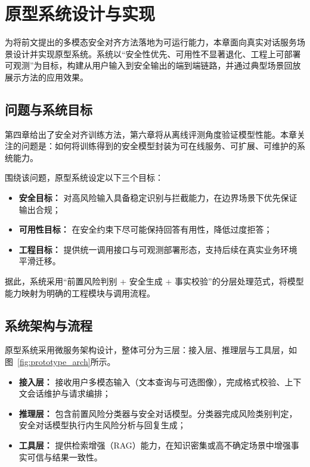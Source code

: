 \chapter{原型系统设计与实现}

为将前文提出的多模态安全对齐方法落地为可运行能力，本章面向真实对话服务场景设计并实现原型系统。系统以“安全性优先、可用性不显著退化、工程上可部署可观测”为目标，构建从用户输入到安全输出的端到端链路，并通过典型场景回放展示方法的应用效果。

\section{问题与系统目标}

第四章给出了安全对齐训练方法，第六章将从离线评测角度验证模型性能。本章关注的问题是：如何将训练得到的安全模型封装为可在线服务、可扩展、可维护的系统能力。

围绕该问题，原型系统设定以下三个目标：
\begin{itemize}
    \item \textbf{安全目标：} 对高风险输入具备稳定识别与拦截能力，在边界场景下优先保证输出合规；
    \item \textbf{可用性目标：} 在安全约束下尽可能保持回答有用性，降低过度拒答；
    \item \textbf{工程目标：} 提供统一调用接口与可观测部署形态，支持后续在真实业务环境平滑迁移。
\end{itemize}

据此，系统采用“前置风险判别 + 安全生成 + 事实校验”的分层处理范式，将模型能力映射为明确的工程模块与调用流程。

\section{系统架构与流程}

原型系统采用微服务架构设计，整体可分为三层：接入层、推理层与工具层，如图~\ref{fig:prototype_arch}所示。

\begin{itemize}
    \item \textbf{接入层：} 接收用户多模态输入（文本查询与可选图像），完成格式校验、上下文会话维护与请求编排；
    \item \textbf{推理层：} 包含前置风险分类器与安全对话模型。分类器完成风险类别判定，安全对话模型执行内生风险分析与回复生成；
    \item \textbf{工具层：} 提供检索增强（RAG）能力，在知识密集或高不确定场景中增强事实可信与结果一致性。
\end{itemize}

